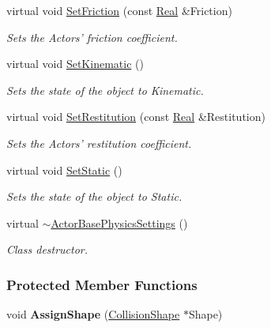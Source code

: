 \begin{DoxyCompactItemize}
virtual void \hyperlink{classphys_1_1ActorBasePhysicsSettings_ad76ddc51fb8514c1cffa9d5f222b580c}{SetFriction} (const \hyperlink{namespacephys_af7eb897198d265b8e868f45240230d5f}{Real} \&Friction)
\begin{DoxyCompactList}\small\item\em Sets the Actors' friction coefficient. \item\end{DoxyCompactList}\item 
virtual void \hyperlink{classphys_1_1ActorBasePhysicsSettings_a3e2a58dbbe32fd193f80821e8dd6e7f5}{SetKinematic} ()
\begin{DoxyCompactList}\small\item\em Sets the state of the object to Kinematic. \item\end{DoxyCompactList}\item 
virtual void \hyperlink{classphys_1_1ActorBasePhysicsSettings_ab379008b313aeeecfe82f641ce8b6305}{SetRestitution} (const \hyperlink{namespacephys_af7eb897198d265b8e868f45240230d5f}{Real} \&Restitution)
\begin{DoxyCompactList}\small\item\em Sets the Actors' restitution coefficient. \item\end{DoxyCompactList}\item 
virtual void \hyperlink{classphys_1_1ActorBasePhysicsSettings_a20addfbc6cdfdc7d6f7847a8695f1172}{SetStatic} ()
\begin{DoxyCompactList}\small\item\em Sets the state of the object to Static. \item\end{DoxyCompactList}\item 
\hypertarget{classphys_1_1ActorBasePhysicsSettings_a6e10308c8888c67a196982bc6cbdebbf}{
virtual \hyperlink{classphys_1_1ActorBasePhysicsSettings_a6e10308c8888c67a196982bc6cbdebbf}{$\sim$ActorBasePhysicsSettings} ()}
\label{classphys_1_1ActorBasePhysicsSettings_a6e10308c8888c67a196982bc6cbdebbf}

\begin{DoxyCompactList}\small\item\em Class destructor. \item\end{DoxyCompactList}\end{DoxyCompactItemize}
\subsubsection*{Protected Member Functions}
\begin{DoxyCompactItemize}
\item 
\hypertarget{classphys_1_1ActorBasePhysicsSettings_ad6d8c9507caab541c7e5034b9488d36e}{
void {\bfseries AssignShape} (\hyperlink{classphys_1_1CollisionShape}{CollisionShape} $\ast$Shape)}
\label{classphys_1_1ActorBasePhysicsSettings_ad6d8c9507caab541c7e5034b9488d36e}

\end{DoxyCompactItemize}
